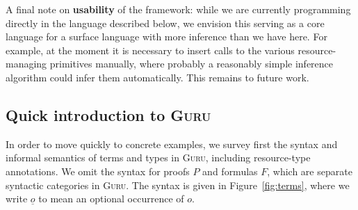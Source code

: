 \documentclass[9pt,natbib]{sigplanconf}
\begin{document}
A final note on \textbf{usability} of the framework: while we are
currently programming directly in the language described below, we
envision this serving as a core language for a surface language with
more inference than we have here.  For example, at the moment it is
necessary to insert calls to the various resource-managing primitives
manually, where probably a reasonably simple inference algorithm could
infer them automatically.  This remains to future work.

\subsection{Quick introduction to \textsc{Guru}}
\label{sec:guru}

In order to move quickly to concrete examples, we survey first the
syntax and informal semantics of terms and types in \textsc{Guru},
including resource-type annotations.  We omit the syntax for proofs
$P$ and formulas $F$, which are separate syntactic categories in
\textsc{Guru}.  The syntax is given in Figure~\ref{fig:terms}, where
we write $\underline{o}$ to mean an optional occurrence of $o$.
\end{document}
